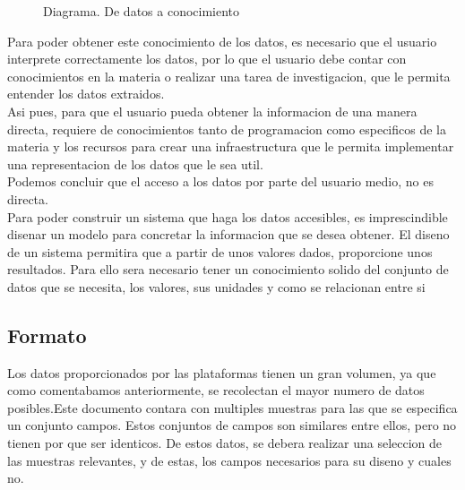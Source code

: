 \begin{figure}[h]
    \centering 
      \caption{Diagrama. De datos a conocimiento}
    \end{figure}
 
Para poder obtener este conocimiento de los datos, es necesario que el usuario interprete correctamente los datos, por lo
que el usuario debe contar con conocimientos en la materia o realizar una tarea de investigacion, que le permita 
entender los datos extraidos. \\

Asi pues, para que el usuario pueda obtener la informacion de una manera directa, requiere de conocimientos tanto 
de programacion como especificos de la materia y los recursos para crear una infraestructura que le permita implementar 
una representacion de los datos que le sea util.\\

Podemos concluir que el acceso a los datos por parte del usuario medio, no es directa.\\

Para poder construir un sistema que haga los datos accesibles, es imprescindible disenar un modelo  para concretar la 
informacion que se desea obtener. El diseno de un sistema permitira que a partir de unos valores dados, proporcione unos resultados.
Para ello sera necesario tener un conocimiento solido del conjunto de datos que se necesita, los valores,
sus unidades y como se relacionan entre si\\
    
\subsection{Formato}

Los datos proporcionados por las plataformas tienen un gran volumen, ya que como comentabamos anteriormente, se recolectan
el mayor numero de datos posibles.Este documento contara con multiples muestras para las que
se especifica un conjunto campos. Estos conjuntos de campos son similares entre ellos, pero no tienen por que ser identicos. 
De estos datos, se debera realizar una seleccion de las muestras relevantes, y de estas, los campos necesarios
para su diseno y cuales no.
\newpage


